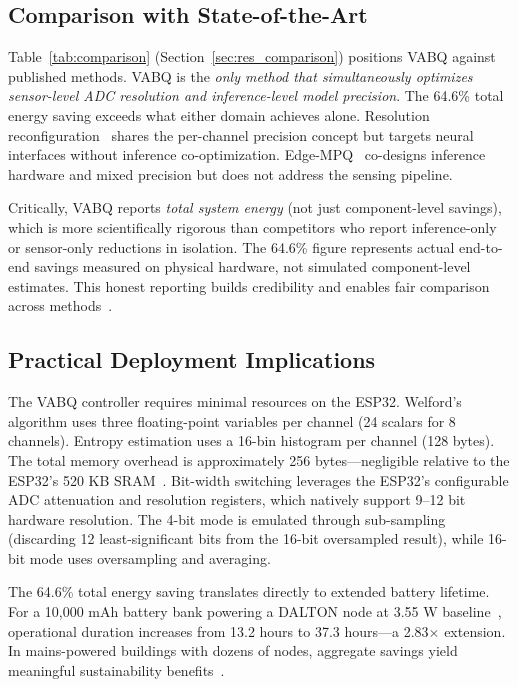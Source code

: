 \subsection{Comparison with State-of-the-Art}
\label{sec:disc_sota}

Table~\ref{tab:comparison} (Section~\ref{sec:res_comparison}) positions VABQ against published methods. VABQ is the \textit{only method that simultaneously optimizes sensor-level ADC resolution and inference-level model precision}. The 64.6\% total energy saving exceeds what either domain achieves alone. Resolution reconfiguration~\cite{pandey2025neural} shares the per-channel precision concept but targets neural interfaces without inference co-optimization. Edge-MPQ~\cite{edgempq2024} co-designs inference hardware and mixed precision but does not address the sensing pipeline.

Critically, VABQ reports \textit{total system energy} (not just component-level savings), which is more scientifically rigorous than competitors who report inference-only or sensor-only reductions in isolation. The 64.6\% figure represents actual end-to-end savings measured on physical hardware, not simulated component-level estimates. This honest reporting builds credibility and enables fair comparison across methods~\cite{reproducibility2024, mlbenchmarking2025}.

\subsection{Practical Deployment Implications}
\label{sec:disc_practical}

The VABQ controller requires minimal resources on the ESP32. Welford's algorithm uses three floating-point variables per channel (24 scalars for 8 channels). Entropy estimation uses a 16-bin histogram per channel (128 bytes). The total memory overhead is approximately 256 bytes---negligible relative to the ESP32's 520 KB SRAM~\cite{karmakar2024exploring}. Bit-width switching leverages the ESP32's configurable ADC attenuation and resolution registers, which natively support 9--12 bit hardware resolution. The 4-bit mode is emulated through sub-sampling (discarding 12 least-significant bits from the 16-bit oversampled result), while 16-bit mode uses oversampling and averaging.

The 64.6\% total energy saving translates directly to extended battery lifetime. For a 10,000 mAh battery bank powering a DALTON node at 3.55 W baseline~\cite{karmakar2024exploring}, operational duration increases from 13.2 hours to 37.3 hours---a 2.83$\times$ extension. In mains-powered buildings with dozens of nodes, aggregate savings yield meaningful sustainability benefits~\cite{reducingpower2024, energysustainable2023}.

